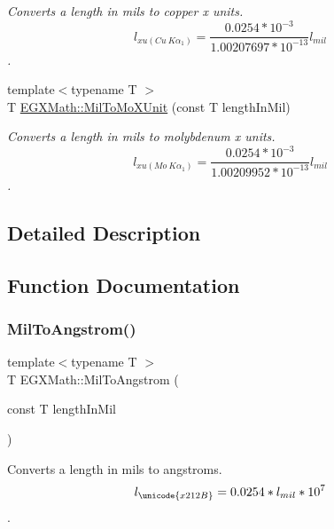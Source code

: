 \begin{DoxyCompactItemize}
\begin{DoxyCompactList}\small\item\em Converts a length in mils to copper x units. \[ l_{xu(Cu\ K\alpha_1)}=\frac{0.0254 * 10^{-3}}{1.00207697*10^{-13}} l_{mil}\]. \end{DoxyCompactList}\item 
{\footnotesize template$<$typename T $>$ }\\T \mbox{\hyperlink{group___e_g_x_math-_conversions-_length_conversions-_imperial-_mil-_non-_s_i_ga673efde012cc982641b2eb1266f88f3a}{E\+G\+X\+Math\+::\+Mil\+To\+Mo\+X\+Unit}} (const T length\+In\+Mil)
\begin{DoxyCompactList}\small\item\em Converts a length in mils to molybdenum x units. \[ l_{xu(Mo\ K\alpha_1)}=\frac{0.0254 * 10^{-3}}{1.00209952*10^{-13}} l_{mil}\]. \end{DoxyCompactList}\end{DoxyCompactItemize}


\subsection{Detailed Description}


\subsection{Function Documentation}
\mbox{\label{group___e_g_x_math-_conversions-_length_conversions-_imperial-_mil-_non-_s_i_gad209d1b047ce810b8879b9ea1ff4a5a5}} 
\subsubsection{\texorpdfstring{Mil\+To\+Angstrom()}{MilToAngstrom()}}
{\footnotesize\ttfamily template$<$typename T $>$ \\
T E\+G\+X\+Math\+::\+Mil\+To\+Angstrom (\begin{DoxyParamCaption}\item[{const T}]{length\+In\+Mil }\end{DoxyParamCaption})}



Converts a length in mils to angstroms. \[ l_{\unicode{x212B}}=0.0254 * l_{mil} * 10^{7} \]. 


